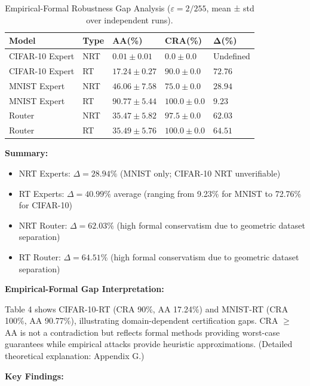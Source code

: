\documentclass[11pt,a4paper]{article}
\begin{document}
\begin{table}[H]
\centering
\begin{tabular}{lllll}
\toprule
\textbf{Model} & \textbf{Type} & \textbf{AA(\%)} & \textbf{CRA(\%)} & $\boldsymbol{\Delta}$\textbf{(\%)} \\
\midrule
CIFAR-10 Expert & NRT & $0.01 \pm 0.01$ & $0.0 \pm 0.0$ & Undefined \\
CIFAR-10 Expert & RT & $17.24 \pm 0.27$ & $90.0 \pm 0.0$ & $72.76$ \\
MNIST Expert & NRT & $46.06 \pm 7.58$ & $75.0 \pm 0.0$ & $28.94$ \\
MNIST Expert & RT & $90.77 \pm 5.44$ & $100.0 \pm 0.0$ & $9.23$ \\
Router & NRT & $35.47 \pm 5.82$ & $97.5 \pm 0.0$ & $62.03$ \\
Router & RT & $35.49 \pm 5.76$ & $100.0 \pm 0.0$ & $64.51$ \\
\bottomrule
\end{tabular}
\caption{Empirical-Formal Robustness Gap Analysis ($\varepsilon = 2/255$, mean ± std over independent runs).}
\end{table}

\textbf{Summary:}
\begin{itemize}
    \item NRT Experts: $\Delta = 28.94\%$ (MNIST only; CIFAR-10 NRT unverifiable)
    \item RT Experts: $\Delta = 40.99\%$ average (ranging from 9.23\% for MNIST to 72.76\% for CIFAR-10)
    \item NRT Router: $\Delta = 62.03\%$ (high formal conservatism due to geometric dataset separation)
    \item RT Router: $\Delta = 64.51\%$ (high formal conservatism due to geometric dataset separation)
\end{itemize}

\textbf{Empirical-Formal Gap Interpretation:}

Table 4 shows CIFAR-10-RT (CRA 90\%, AA 17.24\%) and MNIST-RT (CRA 100\%, AA 90.77\%), illustrating domain-dependent certification gaps. CRA $\geq$ AA is not a contradiction but reflects formal methods providing worst-case guarantees while empirical attacks provide heuristic approximations. (Detailed theoretical explanation: Appendix G.)

\textbf{Key Findings:}
\end{document}
